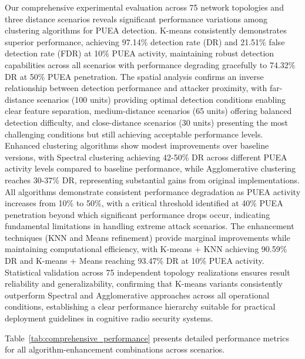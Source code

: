\documentclass[pdflatex,sn-mathphys-num]{sn-jnl}%
\theoremstyle{thmstyleone}
\theoremstyle{thmstyletwo}
\theoremstyle{thmstylethree}
\begin{document}
Our comprehensive experimental evaluation across 75 network topologies and three distance scenarios reveals significant performance variations among clustering algorithms for PUEA detection. K-means consistently demonstrates superior performance, achieving 97.14\% detection rate (DR) and 21.51\% false detection rate (FDR) at 10\% PUEA activity, maintaining robust detection capabilities across all scenarios with performance degrading gracefully to 74.32\% DR at 50\% PUEA penetration. The spatial analysis confirms an inverse relationship between detection performance and attacker proximity, with far-distance scenarios (100 units) providing optimal detection conditions enabling clear feature separation, medium-distance scenarios (65 units) offering balanced detection difficulty, and close-distance scenarios (30 units) presenting the most challenging conditions but still achieving acceptable performance levels. Enhanced clustering algorithms show modest improvements over baseline versions, with Spectral clustering achieving 42-50\% DR across different PUEA activity levels compared to baseline performance, while Agglomerative clustering reaches 30-37\% DR, representing substantial gains from original implementations. All algorithms demonstrate consistent performance degradation as PUEA activity increases from 10\% to 50\%, with a critical threshold identified at 40\% PUEA penetration beyond which significant performance drops occur, indicating fundamental limitations in handling extreme attack scenarios. The enhancement techniques (KNN and Means refinement) provide marginal improvements while maintaining computational efficiency, with K-means + KNN achieving 90.59\% DR and K-means + Means reaching 93.47\% DR at 10\% PUEA activity. Statistical validation across 75 independent topology realizations ensures result reliability and generalizability, confirming that K-means variants consistently outperform Spectral and Agglomerative approaches across all operational conditions, establishing a clear performance hierarchy suitable for practical deployment guidelines in cognitive radio security systems.


Table~\ref{tab:comprehensive_performance} presents detailed performance metrics for all algorithm-enhancement combinations across scenarios.
\end{document}
